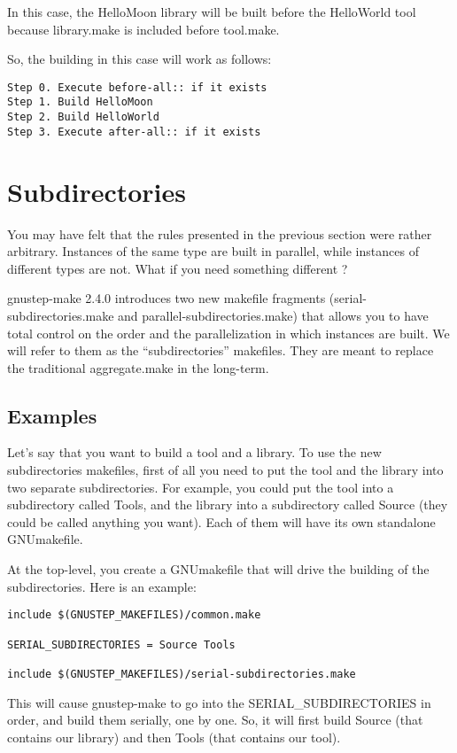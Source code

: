 \documentclass[a4paper]{article}
\begin{document}
In this case, the HelloMoon library will be built before the
HelloWorld tool because library.make is included before tool.make.

So, the building in this case will work as follows:

\begin{verbatim}
Step 0. Execute before-all:: if it exists
Step 1. Build HelloMoon
Step 2. Build HelloWorld
Step 3. Execute after-all:: if it exists
\end{verbatim}


\section{Subdirectories}
You may have felt that the rules presented in the previous section
were rather arbitrary.  Instances of the same type are built in
parallel, while instances of different types are not.  What if you
need something different ?

gnustep-make 2.4.0 introduces two new makefile fragments
(serial-subdirectories.make and parallel-subdirectories.make) that
allows you to have total control on the order and the parallelization
in which instances are built.  We will refer to them as the
``subdirectories'' makefiles.  They are meant to replace the
traditional aggregate.make in the long-term.

\subsection{Examples}
Let's say that you want to build a tool and a library.  To use the new
subdirectories makefiles, first of all you need to put the tool and
the library into two separate subdirectories.  For example, you could
put the tool into a subdirectory called Tools, and the library into a
subdirectory called Source (they could be called anything you want).
Each of them will have its own standalone GNUmakefile.

At the top-level, you create a GNUmakefile that will drive the
building of the subdirectories.  Here is an example:

\begin{verbatim}
include $(GNUSTEP_MAKEFILES)/common.make

SERIAL_SUBDIRECTORIES = Source Tools

include $(GNUSTEP_MAKEFILES)/serial-subdirectories.make
\end{verbatim}

This will cause gnustep-make to go into the SERIAL\_SUBDIRECTORIES in
order, and build them serially, one by one.  So, it will first build
Source (that contains our library) and then Tools (that contains our
tool).
\end{document}
